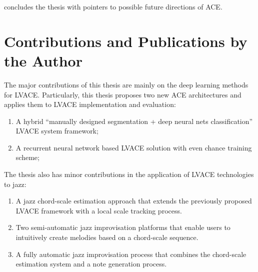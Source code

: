  concludes the thesis with pointers to possible future directions of ACE.


\section{Contributions and Publications by the Author} \label{sec:1-contribution}
The major contributions of this thesis are mainly on the deep learning methods for LVACE. Particularly, this thesis proposes two new ACE architectures and applies them to LVACE implementation and evaluation:
\begin{enumerate}
\item A hybrid ``manually designed segmentation + deep neural nets classification'' LVACE system framework;
\item A recurrent neural network based LVACE solution with even chance training scheme;
\end{enumerate}

The thesis also has minor contributions in the application of LVACE technologies to jazz:
\begin{enumerate}
\item A jazz chord-scale estimation approach that extends the previously proposed LVACE framework with a local scale tracking process.
\item Two semi-automatic jazz improvisation platforms that enable users to intuitively create melodies based on a chord-scale sequence.
\item A fully automatic jazz improvisation process that combines the chord-scale estimation system and a note generation process.
\end{enumerate}

